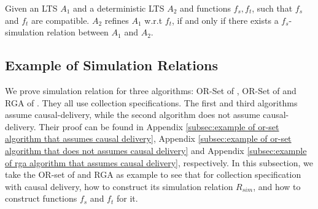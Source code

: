 
\begin{theorem}
\label{theorem:equivalence of our simulation and refinement}
Given an LTS $A_1$ and a deterministic LTS $A_2$ and functions $f_s,f_t$, such that $f_s$ and $f_t$ are compatible. $A_2$ refines $A_1$ w.r.t $f_t$, if and only if there exists a $f_s$-simulation relation between $A_1$ and $A_2$.
\end{theorem}



\subsection{Example of Simulation Relations}
\label{subsec:collection specification with calusal delivery}

We prove simulation relation for three algorithms: OR-Set of \cite{Shapiro:2011}, OR-Set of \cite{Bieniusa:2012} and RGA of \cite{Attiya:2016}. They all use collection specifications. The first and third algorithms assume causal-delivery, while the second algorithm does not assume causal-delivery. Their proof can be found in Appendix \ref{subsec:example of or-set algorithm that assumes causal delivery}, Appendix \ref{subsec:example of or-set algorithm that does not assumes causal delivery} and Appendix \ref{subsec:example of rga algorithm that assumes causal delivery}, respectively. In this subsection, we take the OR-set of \cite{Shapiro:2011} and RGA as example to see that for collection specification with causal delivery, how to construct its simulation relation $R_{\mathit{sim}}$, and how to construct functions $f_s$ and $f_t$ for it.



